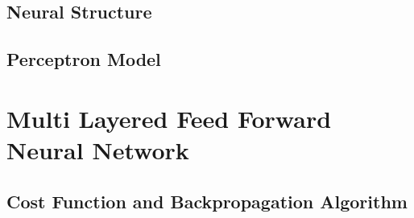 \subsection{Neural Structure}
 
\subsection{Perceptron Model}

\pagebreak
\section{Multi Layered Feed Forward Neural Network}

\pagebreak
\subsection{Cost Function and Backpropagation Algorithm}
